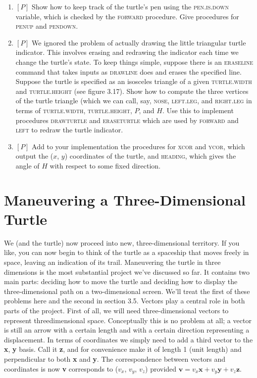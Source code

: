 \documentclass{book}
\begin{document}
\begin{enumerate}
\item $[P]$ Show how to keep track of the turtle's pen using the \textsc{pen}\textsc{.is}\textsc{.down}
variable, which is checked by the \textsc{forward} procedure. Give procedures
for \textsc{penup} and \textsc{pendown}.
\item $[P]$ We ignored the problem of actually drawing the little triangular turtle indicator. This involves erasing and redrawing the indicator
each time we change the turtle's state. To keep things simple, suppose
there is an \textsc{eraseline} command that takes inputs as \textsc{drawline} does
and erases the specified line. Suppose the turtle is specified as an isosceles triangle of a given \textsc{turtle}\textsc{.width} and \textsc{turtle}\textsc{.height} (see figure
3.17). Show how to compute the three vertices of the turtle triangle
(which we can call, say, \textsc{nose}, \textsc{left.leg}, and \textsc{right.leg} in terms of
\textsc{turtle}\textsc{.width}, \textsc{turtle}\textsc{.height}, $P$, and $H$. Use this to implement procedures \textsc{drawturtle} and \textsc{eraseturtle} which are used by \textsc{forward} and
\textsc{left} to redraw the turtle indicator.  
\item $[P]$ Add to your implementation the procedures for \textsc{xcor} and \textsc{ycor},
which output the ($x$, $y$) coordinates of the turtle, and \textsc{heading}, which
gives the angle of $H$ with respect to some fixed direction.
\end{enumerate}

\section{Maneuvering a Three-Dimensional Turtle}

We (and the turtle) now proceed into new, three-dimensional territory.
If you like, you can now begin to think of the turtle as a spaceship that
moves freely in space, leaving an indication of its trail. Maneuvering the
turtle in three dimensions is the most substantial project we've discussed
so far. It contains two main parts: deciding how to move the turtle and
deciding how to display the three-dimensional path on a two-dimensional
screen. We'll treat the first of these problems here and the second in
section 3.5. Vectors play a central role in both parts of the project.
First of all, we will need three-dimensional vectors to represent threedimensional space. Conceptually this is no problem at all; a vector is still
an arrow with a certain length and with a certain direction representing
a displacement. In terms of coordinates we simply need to add a third
vector to the \textbf{x}, \textbf{y} basis. Call it \textbf{z}, and for convenience make it of length
1 (unit length) and perpendicular to both \textbf{x} and \textbf{y}. The correspondence
between vectors and coordinates is now
 \textbf{v} corresponds to ($v_x$, $v_y$, $v_z$) provided $\mathbf{v} = v_x\mathbf{x} + v_y\mathbf{y} + v_z\mathbf{z}$.
\end{document}
